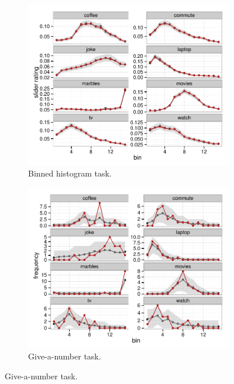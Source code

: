 \documentclass[10pt,letterpaper]{article}
\begin{document}
\begin{figure}
  \centering
  \begin{subfigure}[b]{0.5\textwidth}
    \includegraphics[width = \textwidth]{plots/ppc_slider.pdf}
    \caption{Binned histogram task.}
    \label{fig:sliderPPC}
  \end{subfigure}
   
  \begin{subfigure}[b]{0.5\textwidth}
    \includegraphics[width = \textwidth]{plots/ppc_number.pdf}
    \caption{Give-a-number task.}
    \label{fig:numberPPC}
  \end{subfigure}


\end{figure}
\end{document}
